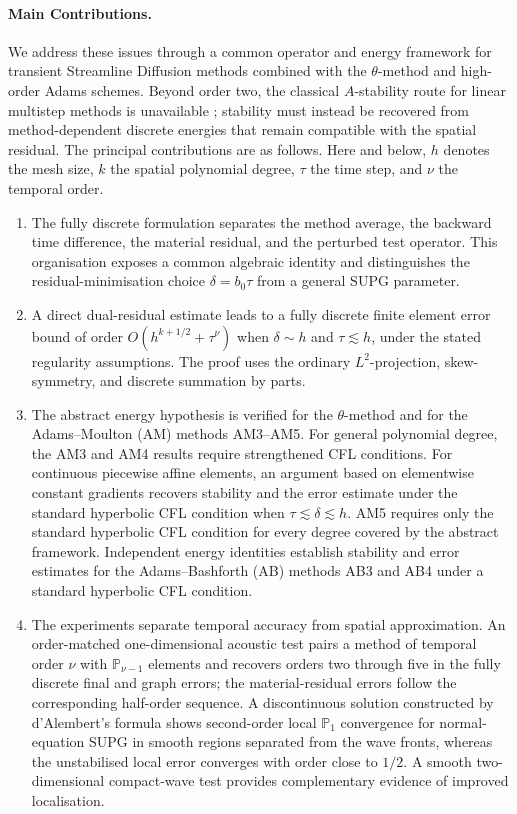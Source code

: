 \documentclass[11pt]{article}
\begin{document}
\paragraph{Main Contributions.}
We address these issues through a common operator and energy framework for
transient Streamline Diffusion methods combined with the \(\theta\)-method
and high-order Adams schemes.
Beyond order two, the classical \(A\)-stability route for linear
multistep methods is unavailable \cite{Dahl63}; stability must instead be
recovered from method-dependent discrete energies that remain compatible with
the spatial residual.
The principal contributions are as follows. Here and below, \(h\) denotes the
mesh size, \(k\) the spatial polynomial degree, \(\tau\) the time step, and
\(\nu\) the temporal order.
\begin{enumerate}
\item The fully discrete formulation separates the method average, the
backward time difference, the material residual, and the perturbed test
operator. This organisation exposes a common algebraic identity and
distinguishes the residual-minimisation choice \(\delta=b_0\tau\) from a
general SUPG parameter.

\item A direct dual-residual estimate leads to a fully discrete finite element
error bound of order \(O(h^{k+1/2}+\tau^\nu)\) when \(\delta\sim h\) and
\(\tau\lesssim h\), under the stated regularity assumptions. The proof uses
the ordinary \(L^2\)-projection, skew-symmetry, and discrete summation by
parts.

\item The abstract energy hypothesis is verified for the \(\theta\)-method and
for the Adams--Moulton (AM) methods AM3--AM5. For general polynomial degree,
the AM3 and AM4 results require strengthened CFL conditions. For continuous
piecewise affine elements, an argument based on elementwise constant gradients
recovers stability
and the error estimate under the standard hyperbolic CFL condition when
\(\tau\lesssim\delta\lesssim h\). AM5 requires only the standard hyperbolic
CFL condition for every degree covered by the abstract framework. Independent
energy identities establish stability and error estimates for the
Adams--Bashforth (AB) methods AB3 and AB4 under a standard hyperbolic CFL
condition.

\item The experiments separate temporal accuracy from spatial approximation.
An order-matched one-dimensional acoustic test pairs a method of temporal
order \(\nu\) with \(\mathbb P_{\nu-1}\) elements and recovers orders two through five in
the fully discrete final and graph errors; the material-residual errors follow
the corresponding half-order sequence. A discontinuous solution constructed
by d'Alembert's formula shows second-order local \(\mathbb P_1\) convergence for
normal-equation SUPG in smooth regions separated from the wave fronts, whereas
the unstabilised local error converges with order close to \(1/2\). A smooth
two-dimensional compact-wave test provides complementary evidence of improved
localisation.
\end{enumerate}
\end{document}
